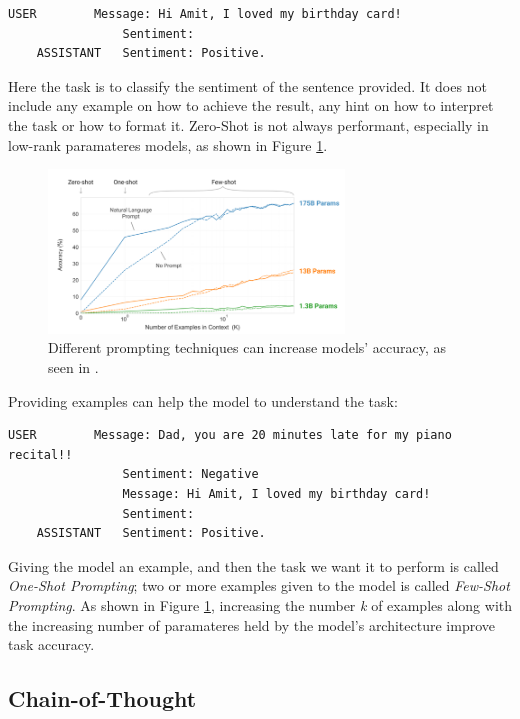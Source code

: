 \begin{Verbatim}[breaklines=true]
    USER        Message: Hi Amit, I loved my birthday card!
                Sentiment:
    ASSISTANT   Sentiment: Positive. 
\end{Verbatim}

Here the task is to classify the sentiment of the sentence provided. It does not include any example on how to achieve the result, any hint on how to interpret the task or how to format it. Zero-Shot is not always performant, especially in low-rank paramateres models, as shown in Figure \ref{fig:prompting-accuracy}.

\begin{figure}[h]
    \centering
    \includegraphics[width=0.7\textwidth]{images/accuracy-prompting-techniques.png}
    \caption{Different prompting techniques can increase models' accuracy, as seen in \cite{brown2020language}.}
    \label{fig:prompting-accuracy}
\end{figure}

Providing examples can help the model to understand the task:

\begin{Verbatim}[breaklines=true]
    USER        Message: Dad, you are 20 minutes late for my piano recital!!
                Sentiment: Negative
                Message: Hi Amit, I loved my birthday card!
                Sentiment:
    ASSISTANT   Sentiment: Positive.
\end{Verbatim}

Giving the model an example, and then the task we want it to perform is called \textit{One-Shot Prompting}; two or more examples given to the model is called \textit{Few-Shot Prompting}. As shown in Figure \ref{fig:prompting-accuracy}, increasing the number \textit{k} of examples along with the increasing number of paramateres held by the model's architecture improve task accuracy.


\subsection{Chain-of-Thought}
\label{sec:cot-prompting}

